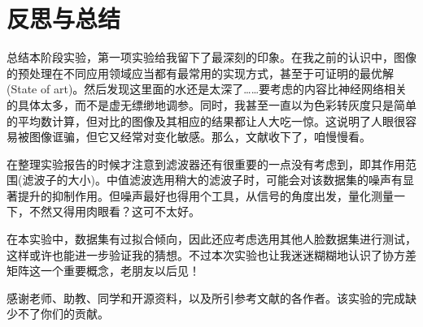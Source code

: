 \chapter{反思与总结}

总结本阶段实验，第一项实验给我留下了最深刻的印象。在我之前的认识中，图像的预处理在不同应用领域应当都有最常用的实现方式，甚至于可证明的最优解(State of art)。然后发现这里面的水还是太深了……要考虑的内容比神经网络相关的具体太多，而不是虚无缥缈地调参。同时，我甚至一直以为色彩转灰度只是简单的平均数计算，但对比的图像及其相应的结果都让人大吃一惊。这说明了人眼很容易被图像诓骗，但它又经常对变化敏感。那么，文献收下了，咱慢慢看。

在整理实验报告的时候才注意到滤波器还有很重要的一点没有考虑到，即其作用范围(滤波子的大小)。中值滤波选用稍大的滤波子时，可能会对该数据集的噪声有显著提升的抑制作用。但噪声最好也得用个工具，从信号的角度出发，量化测量一下，不然又得用肉眼看？这可不太好。

在本实验中，数据集有过拟合倾向，因此还应考虑选用其他人脸数据集进行测试，这样或许也能进一步验证我的猜想。不过本次实验也让我迷迷糊糊地认识了协方差矩阵这一个重要概念，老朋友以后见！

感谢老师、助教、同学和开源资料，以及所引参考文献的各作者。该实验的完成缺少不了你们的贡献。